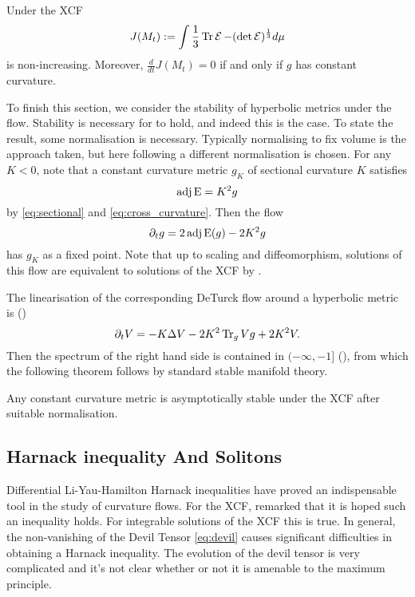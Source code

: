 \documentclass[a4paper,12pt]{amsart}
\begin{document}
\begin{thm}[{\cite[Theorem 8]{MR2055396}}]
\label{thm:hyperbolicity}
Under the XCF
\[J(M_t):=\int \frac{1}{3} \operatorname{Tr} \operatorname{\mathcal{E}} - (\det\operatorname{\mathcal{E}})^{\frac{1}{3}}d\mu\]
is non-increasing. Moreover, \(\frac{d}{dt}J(M_t) = 0\) if and only if $g$ has constant curvature.
\end{thm}

To finish this section, we consider the stability of hyperbolic metrics under the flow. Stability is necessary for  to hold, and indeed this is the case. To state the result, some normalisation is necessary. Typically normalising to fix volume is the approach taken, but here following \cite{MR2448593} a different normalisation is chosen. For any \(K < 0\), note that a constant curvature metric \(g_K\) of sectional curvature \(K\) satisfies
\[
\operatorname{adj}\operatorname{E} = K^2 g
\]
by \eqref{eq:sectional} and \eqref{eq:cross_curvature}. Then the flow
\[
\partial_t g = 2\operatorname{adj}\operatorname{E}(g) - 2K^2 g
\]
has \(g_K\) as a fixed point. Note that up to scaling and diffeomorphism, solutions of this flow are equivalent to solutions of the XCF by \cite[Lemma 1]{MR2448593}.

The linearisation of the corresponding DeTurck flow around a hyperbolic metric is (\cite[Lemma 2]{MR2448593})
\[
\partial_t V = -K \Delta V -2K^2 \operatorname{Tr}_g V g + 2K^2 V.
\]
Then the spectrum of the right hand side is contained in \((-\infty, -1]\) (\cite[Section 5]{MR2448593}), from which the following theorem follows by standard stable manifold theory.

\begin{thm}[{\cite[Theorem 4]{MR2448593}}]
\label{thm:hyperbolic_stability}

Any constant curvature metric is asymptotically stable under the XCF after suitable normalisation.
\end{thm}

\subsection{Harnack inequality And Solitons}
\label{subsec:xcf_harnack_solitons}

Differential Li-Yau-Hamilton Harnack inequalities have proved an indispensable tool in the study of curvature flows. For the XCF, \cite[p. 9]{MR2055396} remarked that it is hoped such an inequality holds. For integrable solutions of the XCF this is true. In general, the non-vanishing of the Devil Tensor \eqref{eq:devil} causes significant difficulties in obtaining a Harnack inequality. The evolution of the devil tensor is very complicated and it's not clear whether or not it is amenable to the  maximum principle.
\end{document}
